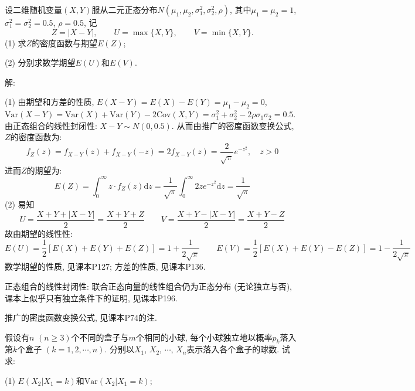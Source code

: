 \documentclass[standard]{ExBook}
\renewenvironment{shaded}{%
  \def\FrameCommand{\fboxsep=\FrameSep \colorbox{shadecolor}}%
  \MakeFramed{\advance\hsize-\width \FrameRestore}%
}{%
  \endMakeFramed
}
\begin{document}
\begin{qitems}
\vspace{2.5cm-5em}

    \begin{bbox}
    \begin{shaded}
        \qitem
设二维随机变量$(X,Y)$服从二元正态分布$N(\mu_1,\mu_2,\sigma_1^2,\sigma_2^2,\rho)$, 其中$\mu_1=\mu_2=1$, $\sigma_1^2=\sigma_2^2=0.5$, $\rho=0.5$, 记
$$Z=|X-Y|,\qquad U=\max\{X,Y\},\qquad V=\min\{X,Y\}.$$
(1) 求$Z$的密度函数与期望$E(Z)$;

(2) 分别求数学期望$E(U)$和$E(V)$.
    \end{shaded}
    \end{bbox}

\vspace{\dimexpr2.5cm-5em\relax}

解: 

(1) 由期望和方差的性质, $E(X-Y)=E(X)-E(Y)=\mu_1-\mu_2=0$, $\mathrm{Var}(X-Y)=\mathrm{Var}(X)+\mathrm{Var}(Y)-2\mathrm{Cov}(X,Y)=\sigma_1^2+\sigma_2^2-2\rho\sigma_1\sigma_2=0.5$. 由正态组合的线性封闭性: $X-Y\sim N(0,0.5)$. 从而由推广的密度函数变换公式, $Z$的密度函数为:
$$f_{Z}(z)=f_{X-Y}(z)+f_{X-Y}(-z)=2f_{X-Y}(z)=\frac{2}{\sqrt{\pi}}e^{-z^2},\quad z>0$$
进而$Z$的期望为:
$$E(Z)=\displaystyle\int_{0}^{\infty}z\cdot f_{Z}(z)\mathrm{d}z=\frac{1}{\sqrt{\pi}}\int_{0}^{\infty}2z e^{-z^2}\mathrm{d}z=\frac{1}{\sqrt{\pi}}$$
(2) 易知
$$U=\displaystyle\frac{X+Y+|X-Y|}{2}=\frac{X+Y+Z}{2} \qquad V=\frac{X+Y-|X-Y|}{2}=\frac{X+Y-Z}{2}$$
故由期望的线性性:
$$E(U)=\frac{1}{2}\left[E(X)+E(Y)+E(Z)\right]=1+\frac{1}{2\sqrt{\pi}} \qquad E(V)=\frac{1}{2}\left[E(X)+E(Y)-E(Z)\right]=1-\frac{1}{2\sqrt{\pi}}$$
\textcolor{themeColor}{\selectfont {} 数学期望的性质, 见课本P127; 方差的性质, 见课本P136.}

\textcolor{themeColor}{\selectfont {} 正态组合的线性封闭性: 联合正态向量的线性组合仍为正态分布 (无论独立与否), 课本上似乎只有独立条件下的证明, 见课本P196.}

\textcolor{themeColor}{\selectfont {} 推广的密度函数变换公式, 见课本P74的注.}

\vspace{2.5cm-5em}

    \begin{bbox}
    \begin{shaded}
        \qitem
假设有$n$ $(n\geq 3)$个不同的盒子与$m$个相同的小球, 每个小球独立地以概率$p_k$落入第$k$个盒子 $(k=1,2,\cdots,n)$. 分别以$X_1$, $X_2$, $\cdots$, $X_n$表示落入各个盒子的球数. 试求:

(1) $E(X_2|X_1=k)$和$\mathrm{Var}(X_2|X_1=k)$;


\end{shaded}
\end{bbox}
\end{qitems}
\end{document}
